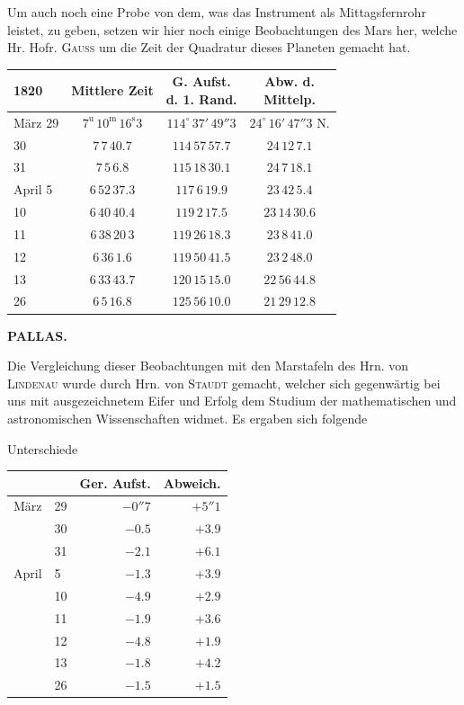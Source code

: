 Um auch noch eine Probe von dem, was das Instrument als Mittagsfernrohr leistet, zu geben, setzen
wir hier noch einige Beobachtungen des Mars her, welche Hr. Hofr. \textsc{Gauss} um die Zeit der
Quadratur dieses Planeten gemacht hat.

\begin{center}
\begin{tabular}{l|c|c|c}
1820 & Mittlere Zeit & \shortstack{G. Aufst.\\d. 1. Rand.} & \shortstack{Abw. d.\\Mittelp.} \\
\hline
März 29 & $7^{\mathrm u}\,10^{\mathrm m}\,16^{\mathrm s}3$ & $114^\circ\,37'\,49''3$ & $24^\circ\,16'\,47''3$ N. \\
30 & $7\,7\,40.7$ & $114\,57\,57.7$ & $24\,12\,7.1$ \\
31 & $7\,5\,6.8$ & $115\,18\,30.1$ & $24\,7\,18.1$ \\
April 5 & $6\,52\,37.3$ & $117\,6\,19.9$ & $23\,42\,5.4$ \\
10 & $6\,40\,40.4$ & $119\,2\,17.5$ & $23\,14\,30.6$ \\
11 & $6\,38\,20\,3$ & $119\,26\,18.3$ & $23\,8\,41.0$ \\
12 & $6\,36\,1.6$ & $119\,50\,41.5$ & $23\,2\,48.0$ \\
13 & $6\,33\,43.7$ & $120\,15\,15.0$ & $22\,56\,44.8$ \\
26 & $6\,5\,16.8$ & $125\,56\,10.0$ & $21\,29\,12.8$ \\
\end{tabular}
\end{center}

\clearpage
\noindent{}%
\makebox[12mm][l]{}%
\parbox[t]{\dimexpr\linewidth-24mm\relax}{\centering\footnotesize\bfseries PALLAS.\par}%
\par\nobreak\medskip
Die Vergleichung dieser Beobachtungen mit den Marstafeln des Hrn. von \textsc{Lindenau}
wurde durch Hrn. von \textsc{Staudt} gemacht, welcher sich gegenwärtig bei uns mit
ausgezeichnetem Eifer und Erfolg dem Studium der mathematischen und astronomischen
Wissenschaften widmet. Es ergaben sich folgende

\begin{center}
Unterschiede

\begin{tabular}{ll|r|r}
 & & Ger. Aufst. & Abweich. \\
\hline
März & 29 & $-0''7$ & $+5''1$ \\
 & 30 & $-0.5$ & $+3.9$ \\
 & 31 & $-2.1$ & $+6.1$ \\
April & 5 & $-1.3$ & $+3.9$ \\
 & 10 & $-4.9$ & $+2.9$ \\
 & 11 & $-1.9$ & $+3.6$ \\
 & 12 & $-4.8$ & $+1.9$ \\
 & 13 & $-1.8$ & $+4.2$ \\
 & 26 & $-1.5$ & $+1.5$ \\
\end{tabular}
\end{center}
